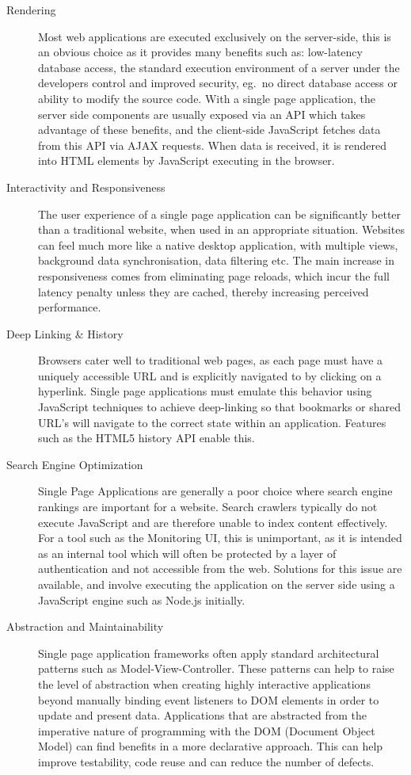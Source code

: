\documentclass{cshonours}
\begin{document}
\begin{description}
  \item[Rendering]
    Most web applications are executed exclusively on the server-side, this is an obvious choice as it provides many benefits such as: low-latency database access, the standard execution environment of a server under the developers control and improved security, eg.\ no direct database access or ability to modify the source code. With a single page application, the server side components are usually exposed via an API which takes advantage of these benefits, and the client-side JavaScript fetches data from this API via AJAX requests. When data is received, it is rendered into HTML elements by JavaScript executing in the browser.
  \item[Interactivity and Responsiveness]
    The user experience of a single page application can be significantly better than a traditional website, when used in an appropriate situation. Websites can feel much more like a native desktop application, with multiple views, background data synchronisation, data filtering etc. The main increase in responsiveness comes from eliminating page reloads, which incur the full latency penalty unless they are cached, thereby increasing perceived performance.
  \item[Deep Linking \& History]
    Browsers cater well to traditional web pages, as each page must have a uniquely accessible URL and is explicitly navigated to by clicking on a hyperlink. Single page applications must emulate this behavior using JavaScript techniques to achieve deep-linking so that bookmarks or shared URL's will navigate to the correct state within an application. Features such as the HTML5 history API enable this.
  \item[Search Engine Optimization]
    Single Page Applications are generally a poor choice where search engine rankings are important for a website. Search crawlers typically do not execute JavaScript and are therefore unable to index content effectively. For a tool such as the Monitoring UI, this is unimportant, as it is intended as an internal tool which will often be protected by a layer of authentication and not accessible from the web. Solutions for this issue are available, and involve executing the application on the server side using a JavaScript engine such as Node.js initially.
  \item[ Abstraction and Maintainability]
    Single page application frameworks often apply standard architectural patterns such as Model-View-Controller. These patterns can help to raise the level of abstraction when creating highly interactive applications beyond manually binding event listeners to DOM elements in order to update and present data. Applications that are abstracted from the imperative nature of programming with the DOM (Document Object Model) can find benefits in a more declarative approach. This can help improve testability, code reuse and can reduce the number of defects.
\end{description}
\end{document}
